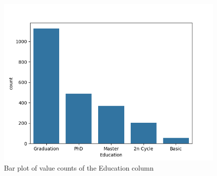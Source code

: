 \begin{figure}[H]
    \centering
    \includegraphics[width=\linewidth]{figures/education_barplot.png}
    \caption{Bar plot of value counts of the Education column}
    \label{fig:educ bar}
\end{figure}


